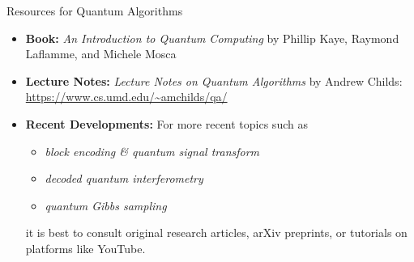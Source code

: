 \documentclass[handout]{beamer} %
\renewcommand{\>}{\rangle}
\newcommand{\<}{\langle}
\theoremstyle{definition}
\begin{document}
\begin{frame}{Resources for Quantum Algorithms}

\begin{itemize}
    \item \textbf{Book:}
    \textit{An Introduction to Quantum Computing} by Phillip Kaye, Raymond Laflamme, and Michele Mosca

    \medskip
    \item \textbf{Lecture Notes:}
    \textit{Lecture Notes on Quantum Algorithms} by Andrew Childs: \url{https://www.cs.umd.edu/~amchilds/qa/}
    
    \medskip
    \item \textbf{Recent Developments:}
    For more recent topics such as 

    \medskip
    \begin{itemize}
        \item \textit{block encoding \& quantum signal transform} 
        
        \medskip
        \item \textit{decoded quantum interferometry}
        
        \medskip
        \item \textit{quantum Gibbs sampling} 
    \end{itemize}

    \medskip
    it is best to consult original research articles, arXiv preprints, or tutorials on platforms like YouTube.
\end{itemize}
\end{frame}
\end{document}
